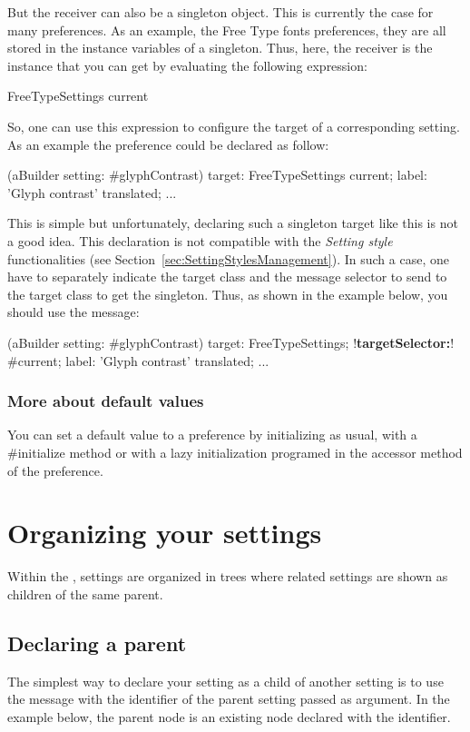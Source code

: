 \documentclass[a4paper,10pt,twoside]{book}
\begin{document}
But the receiver can also be a singleton object. This is currently the case for many preferences. As an example, the Free Type fonts preferences, they are all stored in the instance variables of a  singleton. Thus, here, the receiver is the  instance that you can get by evaluating the following expression:
\begin{code}{}
FreeTypeSettings current
\end{code}
So, one can use this expression  to configure the target of a corresponding setting. As an example the  preference could be declared as follow:
\begin{code}{}
(aBuilder setting: #glyphContrast) 
	target: FreeTypeSettings current;
	label: 'Glyph contrast' translated;
    ...
\end{code}
This is simple but unfortunately, declaring such a singleton target like this is not a good idea. This declaration is not compatible with the \textit{Setting style} functionalities (see Section~\ref{sec:SettingStylesManagement}). In such a case, one have to separately indicate the target class and the message selector to send to the target class to get the singleton. Thus, as shown in the example below, you should use the  message:

\begin{code}{}
(aBuilder setting: #glyphContrast) 
	target: FreeTypeSettings;
	!\textbf{targetSelector:}! #current;
	label: 'Glyph contrast' translated;
    ...
\end{code}

\subsubsection{More about default values}
You can set a default value to a preference by initializing as usual, with a #initialize method or with a lazy initialization programed in the accessor method of the preference.

\section{Organizing your settings}

Within the \setbrowser, settings are organized in trees where related settings are shown as children of the same parent. 

\subsection{Declaring a parent}
The simplest way to declare your setting as a child of another setting is to use the  message with the identifier of the parent setting passed as argument. In the example below, the parent node is an existing node declared with the  identifier. 
\end{document}
